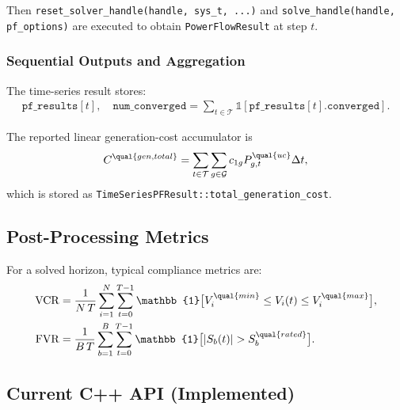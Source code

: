 Then \texttt{reset\_solver\_handle(handle, sys\_t, ...)} and
\texttt{solve\_handle(handle, pf\_options)} are executed to obtain
\texttt{PowerFlowResult} at step \(t\).

\subsubsection{Sequential Outputs and Aggregation}

The time-series result stores:
\begin{align}
\texttt{pf\_results}[t],\quad
\texttt{num\_converged} = \sum_{t\in\mathcal{T}} \mathbb{1}[\texttt{pf\_results}[t].\texttt{converged}].
\end{align}

The reported linear generation-cost accumulator is
\begin{align}
C^{\qual{gen,total}} =
\sum_{t\in\mathcal{T}}\sum_{g\in\mathcal{G}}
 c_{1g} P_{g,t}^{\qual{uc}}\Delta t,
\label{eq:tdpf-cost-impl}
\end{align}
which is stored as \texttt{TimeSeriesPFResult::total\_generation\_cost}.

\subsection{Post-Processing Metrics}
\label{sec:ts-metrics}

For a solved horizon, typical compliance metrics are:
\begin{align}
\mathrm{VCR} &= \frac{1}{N\,T}\sum_{i=1}^{N}\sum_{t=0}^{T-1}
\mathbb{1}\bigl[V_i^{\qual{min}} \le V_i(t) \le V_i^{\qual{max}}\bigr], \\
\mathrm{FVR} &= \frac{1}{B\,T}\sum_{b=1}^{B}\sum_{t=0}^{T-1}
\mathbb{1}\bigl[|S_b(t)| > S_b^{\qual{rated}}\bigr].
\end{align}

\subsection{Current C++ API (Implemented)}
\label{sec:ts-api}

